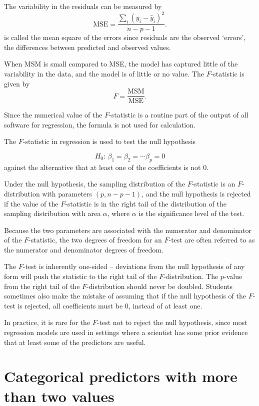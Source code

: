 The variability in the residuals can be measured by 
\[
  \text{MSE} = \frac{\sum_i(y_i - \hat{y}_i)^2}{n - p - 1}.
\]
 is called the mean square of the errors since residuals are
the observed `errors', the differences between predicted and observed
values.

When MSM is small compared to MSE, the model has captured little of the variability in the data, and the model is of little or no value.  The $F$-statistic is given by
\[
  F = \frac{\text{MSM}}{\text{MSE}}.
\]

Since the numerical value of the $F$-statistic is a routine part of the output of all software for regression, the formula is not used for calculation.

\begin{termBox}{
The $F$-statistic in regression is used to test the null hypothesis 

\[
  H_0:\, \beta_1 = \beta_2 = \cdots \beta_p = 0
\]
against the alternative that at least one of the coefficients is not 0.

Under the null hypothesis, the sampling distribution of the $F$-statistic is an $F$-distribution with parameters $(p, n - p - 1)$, and the null hypothesis is rejected if the value of the $F$-statistic is in the right tail of the distribution of the sampling distribution with area $\alpha$, where $\alpha$ is the significance level of the test.}
\end{termBox}

Because the two parameters are associated with the numerator and denominator of the $F$-statistic, the two degrees of freedom for an $F$-test are often referred to as the numerator and denominator degrees of freedom.

The $F$-test is inherently one-sided -- deviations from the null hypothesis of any form will push the statistic to the right tail of the $F$-distribution.  The $p$-value from the right tail of the $F$-distribution should never be doubled.  Students sometimes also make the mistake of assuming that if the null hypothesis of the $F$-test is rejected, all coefficients must be 0, instead of at least one.

In practice, it is rare for the $F$-test not to reject the null hypothesis, since most regression models are used in settings where a scientist has some prior evidence that at least some of the predictors are useful.


\section{Categorical predictors with more than two values}

